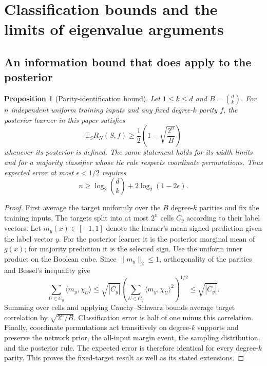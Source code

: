 \documentclass[11pt]{article}
\newtheorem{proposition}[theorem]{Proposition}
\theoremstyle{remark}
\begin{document}


\section{Classification bounds and the limits of eigenvalue arguments}
\label{sec:classification-bounds}



\subsection{An information bound that does apply to the posterior}

\begin{proposition}[Parity-identification bound]
\label{prop:information-bound}
Let $1\le k\le d$ and $B=\binom dk$. For $n$ independent uniform
training inputs and any fixed degree-$k$ parity $f$, the posterior
learner in this paper satisfies
\begin{equation}\label{eq:information-lower-bound}
 \mathbb E_S R_N(S,f)\ge
 \frac12\left(1-\sqrt{\frac{2^n}{B}}\right)
\end{equation}
whenever its posterior is defined. The same statement holds for its
width limits and for a majority classifier whose tie rule respects
coordinate permutations. Thus expected error at most
$\epsilon<1/2$ requires
\[
 n\ge\log_2\binom dk+2\log_2(1-2\epsilon).
\]
\end{proposition}

\begin{proof}
First average the target uniformly over the $B$ degree-$k$ parities
and fix the training inputs. The targets split into at most $2^n$
cells $C_y$ according to their label vectors. Let $m_y(x)\in[-1,1]$
denote the learner's mean signed prediction given the label vector
$y$. For the posterior learner it is the posterior marginal mean of
$g(x)$; for majority prediction it is the selected sign. Use the
uniform inner product on the Boolean cube. Since
$\|m_y\|_2\le1$, orthogonality of the parities and Bessel's inequality
give
\[
 \sum_{U\in C_y}\langle m_y,\chi_U\rangle
 \le \sqrt{|C_y|}
       \left(\sum_{U\in C_y}\langle m_y,\chi_U\rangle^2\right)^{1/2}
 \le \sqrt{|C_y|}.
\]
Summing over cells and applying Cauchy--Schwarz bounds average target
correlation by $\sqrt{2^n/B}$. Classification error is half of one
minus this correlation. Finally, coordinate permutations act
transitively on degree-$k$ supports and preserve the network prior,
the all-input margin event, the sampling distribution, and the
posterior rule. The expected error is therefore identical for every
degree-$k$ parity. This proves the fixed-target result as well as its
stated extensions.
\end{proof}
\end{document}
